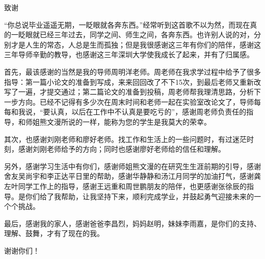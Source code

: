 \begin{szuAppendix}{致谢}


“你总说毕业遥遥无期，一眨眼就各奔东西。”经常听到这首歌不以为然，而现在真的一眨眼就已经三年过去，同学之间、师生之间，各奔东西。也许别人说的对，分别才是人生的常态，人总是生而孤独；但是我很感谢这三年有你们的陪伴，感谢这三年导师辛勤的教导，也感谢这三年深圳大学使我成长了起来，并有了归属感。

首先，最该感谢的当然是我的导师周明洋老师。周老师在我求学过程中给予了很多指导：第一篇小论文的准备到写成，来来回回改了不下15次，到最后老师又重新改写了一遍，才提交通过；第二篇论文的准备到投稿，周老师帮我理清思路，分析下一步方向。已经不记得有多少次在周末时间和老师一起在实验室改论文了，导师每每和我说，“要认真，以后在工作中不认真是要吃亏的”，感谢周老师负责任的指导，和师姐熊文漫所说的一样，能称为您的学生是我莫大的荣幸。

其次，也感谢刘刚老师和廖好老师。找工作和生活上的一些问题时，有过迷茫时刻，感谢刘刚老师给予的方向；同时也感谢廖好老师给的信任和理解。

另外，感谢学习生活中有你们，感谢师姐熊文漫的在研究生生涯前期的引导，感谢舍友吴尚宇和李正达平日里的帮助，感谢华静静和汤江月同学的加油打气，感谢龚左叶同学工作上的指导，感谢王远重和周世鹏朋友的陪伴，也更感谢张徐辰的指导。是你们给了我帮助，让我坚持下来，顺利完成学业，并鼓起勇气迎接未来的一个个挑战。

最后，感谢我的家人，感谢爸爸李昌烈，妈妈赵明，妹妹李雨嘉，是你们的支持、理解、鼓舞，才有了现在的我。

谢谢你们！

\end{szuAppendix}
